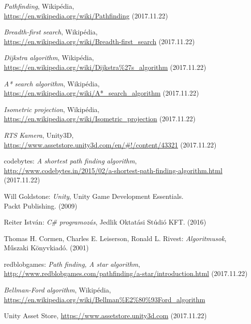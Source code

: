 \begin{thebibliography}{x}
\emph{Pathfinding}, Wikipédia, \\
\url{https://en.wikipedia.org/wiki/Pathfinding} (2017.11.22)

\emph{Breadth-first search}, Wikipédia, \\
\url{https://en.wikipedia.org/wiki/Breadth-first\_search} (2017.11.22)

\emph{Dijkstra algorithm}, Wikipédia, \\
\url{https://en.wikipedia.org/wiki/Dijkstra\%27s\_algorithm} (2017.11.22)

\emph{A* search algorithm}, Wikipédia, \\
\url{https://en.wikipedia.org/wiki/A*\_search\_algorithm} (2017.11.22)

\emph{Isometric projection}, Wikipédia, \\
\url{https://en.wikipedia.org/wiki/Isometric\_projection} (2017.11.22)

\emph{RTS Kamera}, Unity3D, \\
\url{https://www.assetstore.unity3d.com/en/\#!/content/43321} (2017.11.22)

codebytes: \emph{A shortest path finding algorithm}, \\
\url{http://www.codebytes.in/2015/02/a-shortest-path-finding-algorithm.html} (2017.11.22)


Will Goldstone: \emph{Unity}, Unity Game Development Essentials. \\
Packt Publishing. (2009)

Reiter István: \emph{C\# programozás}, Jedlik Oktatási Stúdió KFT. (2016)

Thomas H. Cormen, Charles E. Leiserson, Ronald L. Rivest: \emph{Algoritmusok}, \\
Műszaki Könyvkiadó. (2001)

redblobgames: \emph{Path finding, A star algorithm}, \\
\url{http://www.redblobgames.com/pathfinding/a-star/introduction.html} (2017.11.22)

\emph{Bellman-Ford algorithm}, Wikipédia, \\
\url{https://en.wikipedia.org/wiki/Bellman\%E2\%80\%93Ford\_algorithm}

Unity Asset Store, \url{https://www.assetstore.unity3d.com} (2017.11.22)


\end{thebibliography}
